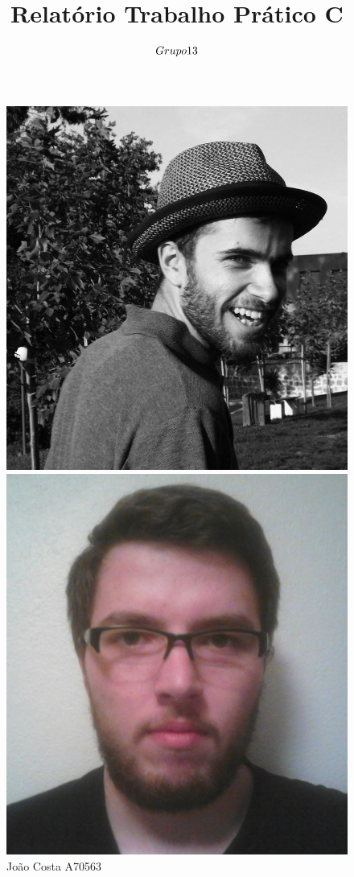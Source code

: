 \documentclass[10pt] {article}
\begin{document}
\title{Relatório Trabalho Prático C \\ $\small{Grupo 13}$}

\maketitle

\begin{figure}[!htb]
  \includegraphics[width=\linewidth]{jc.jpg}
  \caption{João Costa A70563}\label{fig:awesome_image1}
\endminipage\hfill
{}
  \includegraphics[width=\linewidth]{ls.jpg}

\end{figure}
\end{document}
